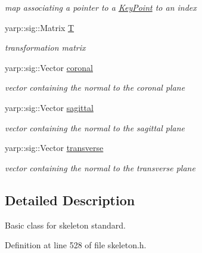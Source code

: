 \begin{DoxyCompactItemize}
\begin{DoxyCompactList}\small\item\em map associating a pointer to a \hyperlink{classassistive__rehab_1_1KeyPoint}{Key\+Point} to an index \end{DoxyCompactList}\item 
\mbox{\label{classassistive__rehab_1_1Skeleton_a358a1c5eb23a562f8558ff8d43583ef7}} 
yarp\+::sig\+::\+Matrix \hyperlink{classassistive__rehab_1_1Skeleton_a358a1c5eb23a562f8558ff8d43583ef7}{T}
\begin{DoxyCompactList}\small\item\em transformation matrix \end{DoxyCompactList}\item 
\mbox{\label{classassistive__rehab_1_1Skeleton_ad042a7e60e6d72cc87b06c5fb0bdfae2}} 
yarp\+::sig\+::\+Vector \hyperlink{classassistive__rehab_1_1Skeleton_ad042a7e60e6d72cc87b06c5fb0bdfae2}{coronal}
\begin{DoxyCompactList}\small\item\em vector containing the normal to the coronal plane \end{DoxyCompactList}\item 
\mbox{\label{classassistive__rehab_1_1Skeleton_a72d6ccb619619e77a17258b08496a972}} 
yarp\+::sig\+::\+Vector \hyperlink{classassistive__rehab_1_1Skeleton_a72d6ccb619619e77a17258b08496a972}{sagittal}
\begin{DoxyCompactList}\small\item\em vector containing the normal to the sagittal plane \end{DoxyCompactList}\item 
\mbox{\label{classassistive__rehab_1_1Skeleton_ab8a9bf9297f520e8de801248e0b8d2dd}} 
yarp\+::sig\+::\+Vector \hyperlink{classassistive__rehab_1_1Skeleton_ab8a9bf9297f520e8de801248e0b8d2dd}{transverse}
\begin{DoxyCompactList}\small\item\em vector containing the normal to the transverse plane \end{DoxyCompactList}\end{DoxyCompactItemize}


\subsection{Detailed Description}
Basic class for skeleton standard. 

Definition at line 528 of file skeleton.\+h.



